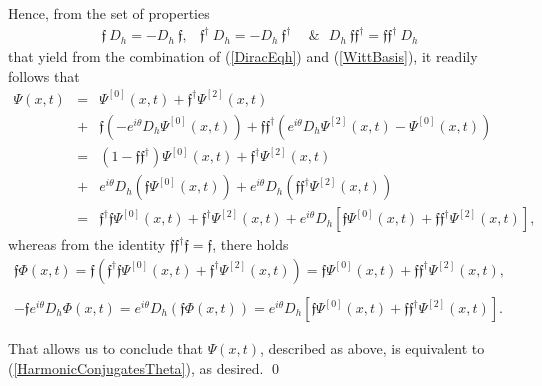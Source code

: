 \documentclass{elsarticle}
\newcommand{\f}{{\mathfrak f}}
\begin{document}
Hence, from 
the set of properties 
\begin{eqnarray*}
	\f ~D_h=-D_h~\f, & \f^\dagger ~D_h=-D_h~\f^\dagger &~~\mbox{\&}~~ ~D_h~\f\f^\dagger=\f\f^\dagger~ D_h
\end{eqnarray*}
that yield from the combination of (\ref{DiracEqh}) and (\ref{WittBasis}), it readily follows that
\begin{eqnarray*}
	\Psi(x,t)&=& \Psi^{[0]}(x,t)+\f^\dagger \Psi^{[2]}(x,t) \\
	&+& \f (-e^{i\theta}D_h\Psi^{[0]}(x,t))+\f \f^\dagger\left(e^{i\theta}D_h\Psi^{[2]}(x,t)-\Psi^{[0]}(x,t)\right)\\
	&=&(1-\f \f^\dagger)\Psi^{[0]}(x,t)+\f^\dagger\Psi^{[2]}(x,t)\\
	&+& e^{i\theta}D_h\left(\f \Psi^{[0]}(x,t)\right)+e^{i\theta}D_h\left(\f \f^\dagger  \Psi^{[2]}(x,t)\right)\\
	&=&\f^\dagger \f \Psi^{[0]}(x,t)+\f^\dagger\Psi^{[2]}(x,t)+e^{i\theta}D_h\left[\f\Psi^{[0]}(x,t)+\f\f^\dagger\Psi^{[2]}(x,t)\right],
\end{eqnarray*}
whereas from the identity $\f\f^\dagger \f=\f$, there holds
\begin{eqnarray*}
	\f \Phi(x,t)= \f \left(\f^\dagger \f \Psi^{[0]}(x,t)+ \f^\dagger \Psi^{[2]}(x,t)\right)=\f \Psi^{[0]}(x,t)+\f \f^\dagger \Psi^{[2]}(x,t), \\ \ \\
	-\f e^{i\theta}D_h\Phi(x,t)=e^{i\theta}D_h(\f\Phi(x,t))=e^{i\theta}D_h\left[\f\Psi^{[0]}(x,t)+\f\f^\dagger\Psi^{[2]}(x,t)\right].
\end{eqnarray*}

That allows us to conclude that $\Psi(x,t)$, described as above, is equivalent to (\ref{HarmonicConjugatesTheta}), as desired.
\qed
\end{document}
